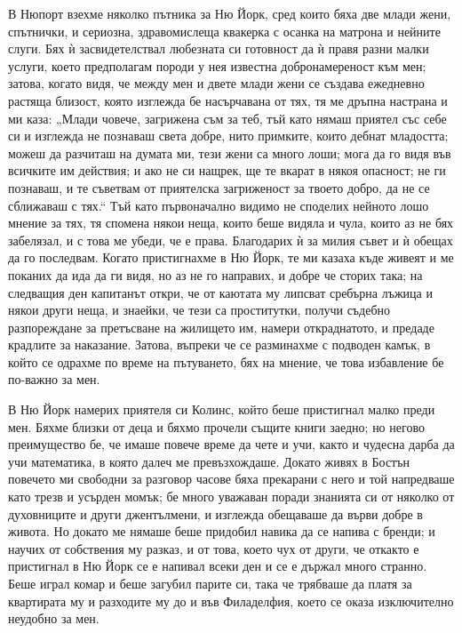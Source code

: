 \documentclass[12pt]{book}
\begin{document}
В Нюпорт взехме няколко пътника за Ню Йорк, сред които бяха две млади жени, спътнички, и сериозна, здравомислеща квакерка с осанка на матрона и нейните слуги. Бях ѝ засвидетелствал любезната си готовност да ѝ правя разни малки услуги, което предполагам породи у нея известна добронамереност към мен; затова, когато видя, че между мен и двете млади жени се създава ежедневно растяща близост, която изглежда бе насърчавана от тях, тя ме дръпна настрана и ми каза: „Млади човече, загрижена съм за теб, тъй като нямаш приятел със себе си и изглежда не познаваш света добре, нито примките, които дебнат младостта; можеш да разчиташ на думата ми, тези жени са много лоши; мога да го видя във всичките им действия; и ако не си нащрек, ще те вкарат в някоя опасност; не ги познаваш, и те съветвам от приятелска загриженост за твоето добро, да не се сближаваш с тях.“ Тъй като първоначално видимо не споделих нейното лошо мнение за тях, тя спомена някои неща, които беше видяла и чула, които аз не бях забелязал, и с това ме убеди, че е права. Благодарих ѝ за милия съвет и ѝ обещах да го последвам. Когато пристигнахме в Ню Йорк, те ми казаха къде живеят и ме поканих да ида да ги видя, но аз не го направих, и добре че сторих така; на следващия ден капитанът откри, че от каютата му липсват сребърна лъжица и някои други неща, и знаейки, че тези са проститутки, получи съдебно разпореждане за претъсване на жилището им, намери откраднатото, и предаде крадлите за наказание. Затова, въпреки че се разминахме с подводен камък, в който се одрахме по време на пътуването, бях на мнение, че това избавление бе по-важно за мен.

В Ню Йорк намерих приятеля си Колинс, който беше пристигнал малко преди мен. Бяхме близки от деца и бяхмо прочели същите книги заедно; но негово преимущество бе, че имаше повече време да чете и учи, както и чудесна дарба да учи математика, в която далеч ме превъзхождаше. Докато живях в Бостън повечето ми свободни за разговор часове бяха прекарани с него и той напредваше като трезв и усърден момък; бе много уважаван поради знанията си от няколко от духовниците и други джентълмени, и изглежда обещаваше да върви добре в живота. Но докато ме нямаше беше придобил навика да се напива с бренди; и научих от собствения му разказ, и от това, което чух от други, че откакто е пристигнал в Ню Йорк се е напивал всеки ден и се е държал много странно. Беше играл комар и беше загубил парите си, така че трябваше да платя за квартирата му и разходите му до и във Филаделфия, което се оказа изключително неудобно за мен.
\end{document}
